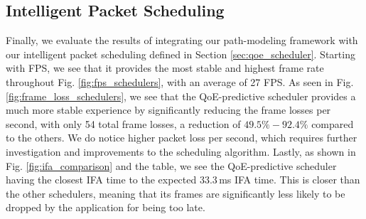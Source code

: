 \documentclass[sigconf,nonacm]{acmart}
\begin{document}
\begin{table}[!htb]
    \centering
    \caption{Video streaming performance across network paths and packet scheduling algorithms. Average FPS, packet loss per second, frame loss per second, and IFA times. Median packet dispersion.}
    \label{tab:video_performance}
\end{table}

\subsection{Intelligent Packet Scheduling}
\label{subsec:intelligent_scheduling}

Finally,  we evaluate the results of integrating our path-modeling framework with our intelligent packet scheduling defined in Section \eqref{sec:qoe_scheduler}. Starting with FPS, we see that it provides the most stable and highest frame rate throughout Fig. \eqref{fig:fps_schedulers}, with an average of 27 FPS. As seen in Fig. \eqref{fig:frame_loss_schedulers}, we see that the QoE-predictive scheduler provides a much more stable experience by significantly reducing the frame losses per second, with only 54 total frame losses, a reduction of $49.5\%-92.4\%$ compared to the others. We do notice higher packet loss per second, which requires further investigation and improvements to the scheduling algorithm. Lastly, as shown in Fig. \eqref{fig:ifa_comparison} and the table, we see the QoE-predictive scheduler having the closest IFA time to the expected 33.3\,ms IFA time. This is closer than the other schedulers, meaning that its frames are significantly less likely to be dropped by the application for being too late.
\end{document}
